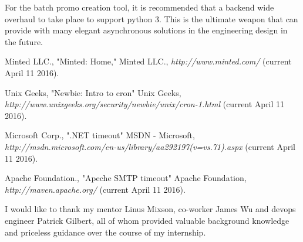 \documentclass[12pt]{article}
\begin{document}
For the batch promo creation tool, it is recommended that a backend wide overhaul to take place to support python 3. This is the ultimate weapon that can provide with many elegant asynchronous solutions in the engineering design in the future.\\




\newpage



\begin{thebibliography}{1}

   Minted LLC., "Minted: Home," Minted LLC., {\em http://www.minted.com/} (current April 11 2016).

   Unix Geeks, "Newbie: Intro to cron" Unix Geeks, {\em http://www.unixgeeks.org/security/newbie/unix/cron-1.html} (current April 11 2016).

 Microsoft Corp., ".NET timeout" MSDN - Microsoft, {\em http://msdn.microsoft.com/en-us/library/aa292197(v=vs.71).aspx} (current April 11 2016).

 Apache Foundation., "Apeche SMTP timeout" Apache Foundation, {\em http://maven.apache.org/} (current April 11 2016).

\end{thebibliography}
\newpage


I would like to thank my mentor Linus Mixson, co-worker James Wu and devops engineer Patrick Gilbert, all of whom provided valuable background knowledge and priceless guidance over the course of my internship.\\
\end{document}
